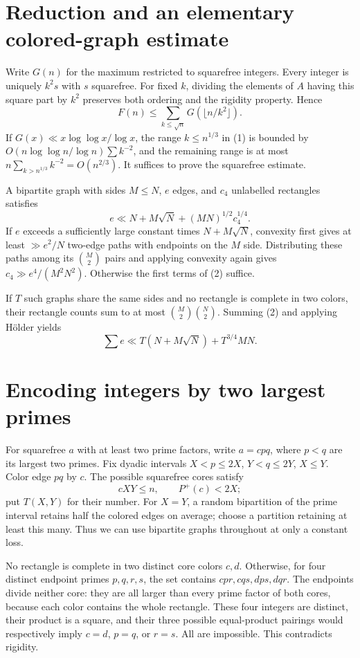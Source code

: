 \documentclass[11pt]{article}
\begin{document}
\section*{Reduction and an elementary colored-graph estimate}
Write $G(n)$ for the maximum restricted to squarefree integers. Every integer is uniquely $k^2s$ with $s$ squarefree. For fixed $k$, dividing the elements of $A$ having this square part by $k^2$ preserves both ordering and the rigidity property. Hence
\[
 F(n)\le\sum_{k\le\sqrt n}G(\lfloor n/k^2\rfloor).\tag{1}
\]
If $G(x)\ll x\log\log x/\log x$, the range $k\le n^{1/3}$ in (1) is bounded by $O(n\log\log n/\log n)\sum k^{-2}$, and the remaining range is at most $n\sum_{k>n^{1/3}}k^{-2}=O(n^{2/3})$. It suffices to prove the squarefree estimate.

A bipartite graph with sides $M\le N$, $e$ edges, and $c_4$ unlabelled rectangles satisfies
\[
 e\ll N+M\sqrt N+(MN)^{1/2}c_4^{1/4}.\tag{2}
\]
If $e$ exceeds a sufficiently large constant times $N+M\sqrt N$, convexity first gives at least $\gg e^2/N$ two-edge paths with endpoints on the $M$ side. Distributing these paths among its $\binom M2$ pairs and applying convexity again gives $c_4\gg e^4/(M^2N^2)$. Otherwise the first terms of (2) suffice.

If $T$ such graphs share the same sides and no rectangle is complete in two colors, their rectangle counts sum to at most $\binom M2\binom N2$. Summing (2) and applying H\"older yields
\[
 \sum e\ll T(N+M\sqrt N)+T^{3/4}MN.\tag{3}
\]

\section*{Encoding integers by two largest primes}
For squarefree $a$ with at least two prime factors, write $a=cpq$, where $p<q$ are its largest two primes. Fix dyadic intervals $X<p\le2X$, $Y<q\le2Y$, $X\le Y$. Color edge $pq$ by $c$. The possible squarefree cores satisfy
\[
 cXY\le n,\qquad P^+(c)<2X;
\]
put $T(X,Y)$ for their number. For $X=Y$, a random bipartition of the prime interval retains half the colored edges on average; choose a partition retaining at least this many. Thus we can use bipartite graphs throughout at only a constant loss.

No rectangle is complete in two distinct core colors $c,d$. Otherwise, for four distinct endpoint primes $p,q,r,s$, the set contains $cpr,cqs,dps,dqr$. The endpoints divide neither core: they are all larger than every prime factor of both cores, because each color contains the whole rectangle. These four integers are distinct, their product is a square, and their three possible equal-product pairings would respectively imply $c=d$, $p=q$, or $r=s$. All are impossible. This contradicts rigidity.
\end{document}
